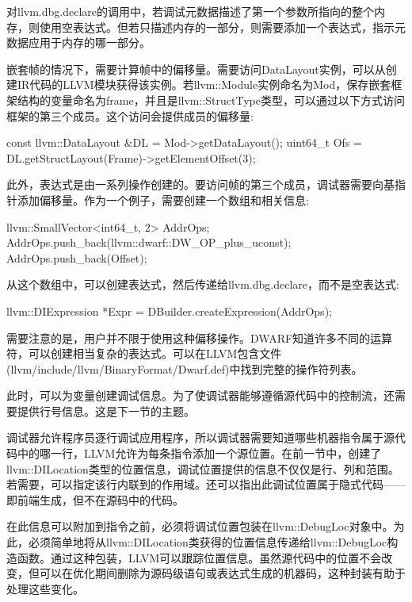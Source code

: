 对llvm.dbg.declare的调用中，若调试元数据描述了第一个参数所指向的整个内存，则使用空表达式。但若只描述内存的一部分，则需要添加一个表达式，指示元数据应用于内存的哪一部分。

嵌套帧的情况下，需要计算帧中的偏移量。需要访问DataLayout实例，可以从创建IR代码的LLVM模块获得该实例。若llvm::Module实例命名为Mod，保存嵌套框架结构的变量命名为frame，并且是llvm::StructType类型，可以通过以下方式访问框架的第三个成员。这个访问会提供成员的偏移量:

\begin{cpp}
const llvm::DataLayout &DL = Mod->getDataLayout();
uint64_t Ofs = DL.getStructLayout(Frame)->getElementOffset(3);
\end{cpp}

此外，表达式是由一系列操作创建的。要访问帧的第三个成员，调试器需要向基指针添加偏移量。作为一个例子，需要创建一个数组和相关信息:

\begin{cpp}
llvm::SmallVector<int64_t, 2> AddrOps;
AddrOps.push_back(llvm::dwarf::DW_OP_plus_uconst);
AddrOps.push_back(Offset);
\end{cpp}

从这个数组中，可以创建表达式，然后传递给llvm.dbg.declare，而不是空表达式:

\begin{cpp}
llvm::DIExpression *Expr = DBuilder.createExpression(AddrOps);
\end{cpp}

需要注意的是，用户并不限于使用这种偏移操作。DWARF知道许多不同的运算符，可以创建相当复杂的表达式。可以在LLVM包含文件(llvm/include/llvm/BinaryFormat/Dwarf.def)中找到完整的操作符列表。

此时，可以为变量创建调试信息。为了使调试器能够遵循源代码中的控制流，还需要提供行号信息。这是下一节的主题。


调试器允许程序员逐行调试应用程序，所以调试器需要知道哪些机器指令属于源代码中的哪一行，LLVM允许为每条指令添加一个源位置。在前一节中，创建了llvm::DILocation类型的位置信息，调试位置提供的信息不仅仅是行、列和范围。若需要，可以指定该行内联到的作用域。还可以指出此调试位置属于隐式代码——即前端生成，但不在源码中的代码。

在此信息可以附加到指令之前，必须将调试位置包装在llvm::DebugLoc对象中。为此，必须简单地将从llvm::DILocation类获得的位置信息传递给llvm::DebugLoc构造函数。通过这种包装，LLVM可以跟踪位置信息。虽然源代码中的位置不会改变，但可以在优化期间删除为源码级语句或表达式生成的机器码，这种封装有助于处理这些变化。

